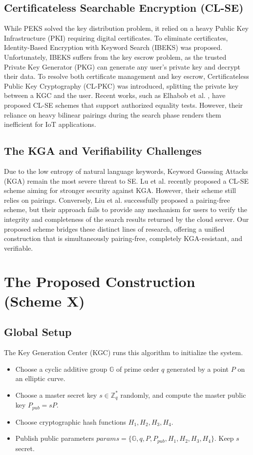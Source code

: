 \documentclass[10pt,journal,compsoc]{IEEEtran}
\begin{document}
\subsection{Certificateless Searchable Encryption (CL-SE)}
While PEKS solved the key distribution problem, it relied on a heavy Public Key Infrastructure (PKI) requiring digital certificates. To eliminate certificates, Identity-Based Encryption with Keyword Search (IBEKS) was proposed. Unfortunately, IBEKS suffers from the key escrow problem, as the trusted Private Key Generator (PKG) can generate any user's private key and decrypt their data. 
To resolve both certificate management and key escrow, Certificateless Public Key Cryptography (CL-PKC) was introduced, splitting the private key between a KGC and the user. Recent works, such as Elhabob et al. \cite{elhabob2020efficient}, have proposed CL-SE schemes that support authorized equality tests. However, their reliance on heavy bilinear pairings during the search phase renders them inefficient for IoT applications.

\subsection{The KGA and Verifiability Challenges}
Due to the low entropy of natural language keywords, Keyword Guessing Attacks (KGA) remain the most severe threat to SE. Lu et al. \cite{lu2023certificateless} recently proposed a CL-SE scheme aiming for stronger security against KGA. However, their scheme still relies on pairings. Conversely, Liu et al. \cite{liu2023pairing} successfully proposed a pairing-free scheme, but their approach fails to provide any mechanism for users to verify the integrity and completeness of the search results returned by the cloud server. Our proposed scheme bridges these distinct lines of research, offering a unified construction that is simultaneously pairing-free, completely KGA-resistant, and verifiable.

\section{The Proposed Construction (Scheme X)}\label{sec:proposed}
\subsection{Global Setup}
The Key Generation Center (KGC) runs this algorithm to initialize the system.
\begin{itemize}
    \item Choose a cyclic additive group $\mathbb{G}$ of prime order $q$ generated by a point $P$ on an elliptic curve.
    \item Choose a master secret key $s \in \mathbb{Z}_q^*$ randomly, and compute the master public key $P_{pub} = sP$.
    \item Choose cryptographic hash functions $H_1, H_2, H_3, H_4$.
    \item Publish public parameters $params = \{\mathbb{G}, q, P, P_{pub}, H_1, H_2, H_3, H_4\}$. Keep $s$ secret.
\end{itemize}
\end{document}
